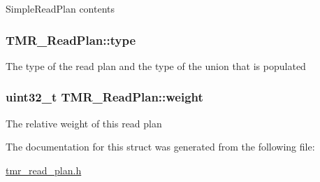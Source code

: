 SimpleReadPlan contents \hypertarget{struct_t_m_r___read_plan_8044ba60e3984ed8fb04fa9d5a8bdd6e}{
\subsubsection[{type}]{ {\bf TMR\_\-ReadPlan::type}}}
\label{struct_t_m_r___read_plan_8044ba60e3984ed8fb04fa9d5a8bdd6e}


The type of the read plan and the type of the union that is populated \hypertarget{struct_t_m_r___read_plan_cc08065d1c7ccb361156c42d56647099}{
\subsubsection[{weight}]{\setlength{\rightskip}{0pt plus 5cm}uint32\_\-t {\bf TMR\_\-ReadPlan::weight}}}
\label{struct_t_m_r___read_plan_cc08065d1c7ccb361156c42d56647099}


The relative weight of this read plan 

The documentation for this struct was generated from the following file:\begin{CompactItemize}
\item 
\hyperlink{tmr__read__plan_8h}{tmr\_\-read\_\-plan.h}\end{CompactItemize}
